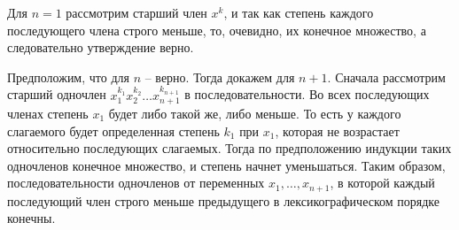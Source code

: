 \documentclass[a4paper, 12pt]{article}
\begin{document}
	Для $n = 1$ рассмотрим старший член $x^k$, и так как степень каждого последующего члена строго меньше, то, очевидно, их конечное множество, а следовательно утверждение верно.
	
	Предположим, что для $n$ -- верно. Тогда докажем для $n + 1$. Сначала рассмотрим старший одночлен $x_1^{k_1}x_2^{k_2}\ldots x_{n+1}^{k_{n+1}}$ в последовательности. Во всех последующих членах степень $x_1$ будет либо такой же, либо меньше. То есть у каждого слагаемого будет определенная степень $k_1$ при $x_1$, которая не возрастает относительно последующих слагаемых. Тогда по предположению индукции таких одночленов конечное множество, и степень начнет уменьшаться. Таким образом, последовательности одночленов от переменных $x_1, \ldots ,x_{n+1}$, в которой каждый последующий член строго меньше предыдущего в лексикографическом порядке конечны. \\
	
\end{document}

